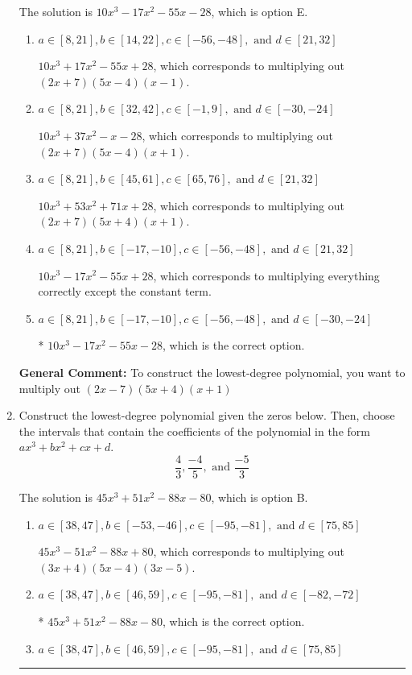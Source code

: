 \documentclass{extbook}[14pt]
\newcommand{\litem}[1]{\item #1

\rule{\textwidth}{0.4pt}}
\begin{document}
\begin{enumerate}
{The solution is \( 10x^{3} -17 x^{2} -55 x -28 \), which is option E.\begin{enumerate}[label=\Alph*.]
\item \( a \in [8, 21], b \in [14, 22], c \in [-56, -48], \text{ and } d \in [21, 32] \)

$10x^{3} +17 x^{2} -55 x + 28$, which corresponds to multiplying out $(2x + 7)(5x -4)(x -1)$.
\item \( a \in [8, 21], b \in [32, 42], c \in [-1, 9], \text{ and } d \in [-30, -24] \)

$10x^{3} +37 x^{2} -x -28$, which corresponds to multiplying out $(2x + 7)(5x -4)(x + 1)$.
\item \( a \in [8, 21], b \in [45, 61], c \in [65, 76], \text{ and } d \in [21, 32] \)

$10x^{3} +53 x^{2} +71 x + 28$, which corresponds to multiplying out $(2x + 7)(5x + 4)(x + 1)$.
\item \( a \in [8, 21], b \in [-17, -10], c \in [-56, -48], \text{ and } d \in [21, 32] \)

$10x^{3} -17 x^{2} -55 x + 28$, which corresponds to multiplying everything correctly except the constant term.
\item \( a \in [8, 21], b \in [-17, -10], c \in [-56, -48], \text{ and } d \in [-30, -24] \)

* $10x^{3} -17 x^{2} -55 x -28$, which is the correct option.
\end{enumerate}

\textbf{General Comment:} To construct the lowest-degree polynomial, you want to multiply out $(2x -7)(5x + 4)(x + 1)$
}
\litem{
Construct the lowest-degree polynomial given the zeros below. Then, choose the intervals that contain the coefficients of the polynomial in the form $ax^3+bx^2+cx+d$.
\[ \frac{4}{3}, \frac{-4}{5}, \text{ and } \frac{-5}{3} \]

The solution is \( 45x^{3} +51 x^{2} -88 x -80 \), which is option B.\begin{enumerate}[label=\Alph*.]
\item \( a \in [38, 47], b \in [-53, -46], c \in [-95, -81], \text{ and } d \in [75, 85] \)

$45x^{3} -51 x^{2} -88 x + 80$, which corresponds to multiplying out $(3x + 4)(5x -4)(3x -5)$.
\item \( a \in [38, 47], b \in [46, 59], c \in [-95, -81], \text{ and } d \in [-82, -72] \)

* $45x^{3} +51 x^{2} -88 x -80$, which is the correct option.
\item \( a \in [38, 47], b \in [46, 59], c \in [-95, -81], \text{ and } d \in [75, 85] \)


\end{enumerate}}
\end{enumerate}
\end{document}
